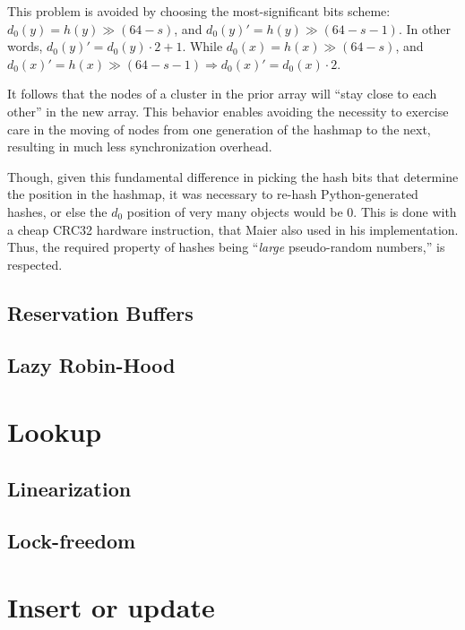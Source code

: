 This problem is avoided by choosing the most-significant bits scheme: $d_0(y) = h(y) \gg (64 - s)$, and $d_0(y)' = h(y) \gg (64 - s - 1)$.
In other words, $d_0(y)' = d_0(y) \cdot 2 + 1$.
While $d_0(x) = h(x) \gg (64 - s)$, and $d_0(x)' = h(x) \gg (64 - s - 1) \Rightarrow d_0(x)' = d_0(x) \cdot 2$.

It follows that the nodes of a cluster in the prior array will ``stay close to each other'' in the new array.
This behavior enables avoiding the necessity to exercise care in the moving of nodes from one generation of the hashmap to the next, resulting in much less synchronization overhead.

Though, given this fundamental difference in picking the hash bits that determine the position in the hashmap, it was necessary to re-hash Python-generated hashes, or else the $d_0$ position of very many objects would be $0$.
This is done with a cheap CRC32 hardware instruction, that Maier also used in his implementation.
Thus, the required property of hashes being ``\emph{large} pseudo-random numbers,'' is respected.

\subsection{Reservation Buffers}

\subsection{Lazy Robin-Hood}

\cite[CMPXCHG--Compare and Exchange]{x86-64}



\section{Lookup}



\subsection{Linearization}
\subsection{Lock-freedom}

\section{Insert or update}

